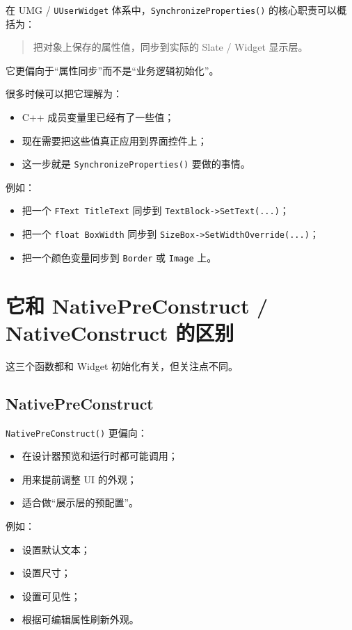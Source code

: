 \documentclass[10pt,CJKmath]{ctexart}
\begin{document}
在 UMG / \texttt{UUserWidget} 体系中，\texttt{SynchronizeProperties()} 的核心职责可以概括为：

\begin{quote}
	把对象上保存的属性值，同步到实际的 Slate / Widget 显示层。
\end{quote}

它更偏向于“属性同步”而不是“业务逻辑初始化”。

很多时候可以把它理解为：

\begin{itemize}
	\item C++ 成员变量里已经有了一些值；
	\item 现在需要把这些值真正应用到界面控件上；
	\item 这一步就是 \texttt{SynchronizeProperties()} 要做的事情。
\end{itemize}

例如：

\begin{itemize}
	\item 把一个 \texttt{FText TitleText} 同步到 \texttt{TextBlock->SetText(...)}；
	\item 把一个 \texttt{float BoxWidth} 同步到 \texttt{SizeBox->SetWidthOverride(...)}；
	\item 把一个颜色变量同步到 \texttt{Border} 或 \texttt{Image} 上。
\end{itemize}

\section{它和 NativePreConstruct / NativeConstruct 的区别}

这三个函数都和 Widget 初始化有关，但关注点不同。

\subsection{NativePreConstruct}

\texttt{NativePreConstruct()} 更偏向：

\begin{itemize}
	\item 在设计器预览和运行时都可能调用；
	\item 用来提前调整 UI 的外观；
	\item 适合做“展示层的预配置”。
\end{itemize}

例如：

\begin{itemize}
	\item 设置默认文本；
	\item 设置尺寸；
	\item 设置可见性；
	\item 根据可编辑属性刷新外观。
\end{itemize}
\end{document}
